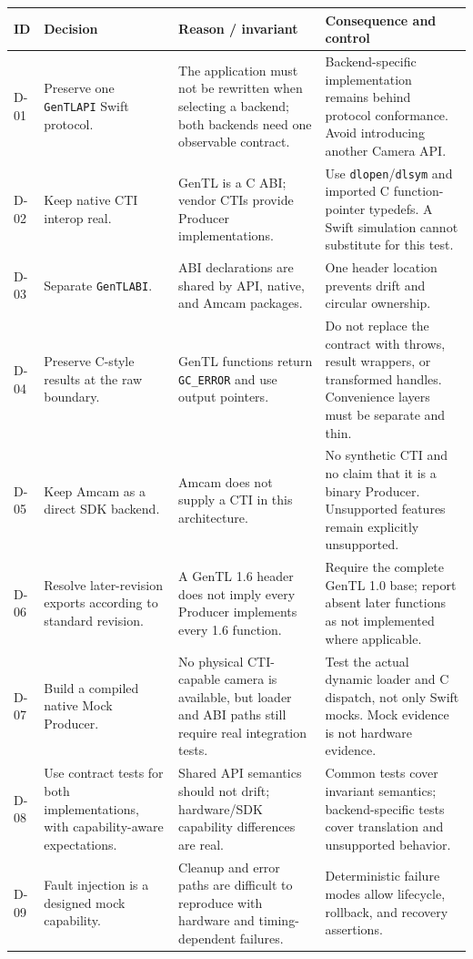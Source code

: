 \documentclass[11pt,a4paper]{report}
\begin{document}
\begin{longtable}{p{}p{}p{}p{}}
\toprule
ID & Decision & Reason / invariant & Consequence and control \\
\midrule
D-01 & Preserve one \texttt{GenTLAPI} Swift protocol. & The application must not be rewritten when selecting a backend; both backends need one observable contract. & Backend-specific implementation remains behind protocol conformance. Avoid introducing another Camera API. \\
D-02 & Keep native CTI interop real. & GenTL is a C ABI; vendor CTIs provide Producer implementations. & Use \texttt{dlopen}/\texttt{dlsym} and imported C function-pointer typedefs. A Swift simulation cannot substitute for this test. \\
D-03 & Separate \texttt{GenTLABI}. & ABI declarations are shared by API, native, and Amcam packages. & One header location prevents drift and circular ownership. \\
D-04 & Preserve C-style results at the raw boundary. & GenTL functions return \texttt{GC\_ERROR} and use output pointers. & Do not replace the contract with throws, result wrappers, or transformed handles. Convenience layers must be separate and thin. \\
D-05 & Keep Amcam as a direct SDK backend. & Amcam does not supply a CTI in this architecture. & No synthetic CTI and no claim that it is a binary Producer. Unsupported features remain explicitly unsupported. \\
D-06 & Resolve later-revision exports according to standard revision. & A GenTL 1.6 header does not imply every Producer implements every 1.6 function. & Require the complete GenTL 1.0 base; report absent later functions as not implemented where applicable. \\
D-07 & Build a compiled native Mock Producer. & No physical CTI-capable camera is available, but loader and ABI paths still require real integration tests. & Test the actual dynamic loader and C dispatch, not only Swift mocks. Mock evidence is not hardware evidence. \\
D-08 & Use contract tests for both implementations, with capability-aware expectations. & Shared API semantics should not drift; hardware/SDK capability differences are real. & Common tests cover invariant semantics; backend-specific tests cover translation and unsupported behavior. \\
D-09 & Fault injection is a designed mock capability. & Cleanup and error paths are difficult to reproduce with hardware and timing-dependent failures. & Deterministic failure modes allow lifecycle, rollback, and recovery assertions. \\

\end{longtable}
\end{document}
